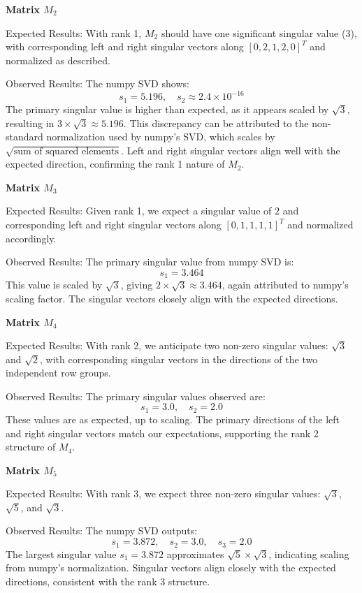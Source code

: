\documentclass[a4paper,oneside,bibliography=totoc]{scrartcl}
\begin{document}
\textbf{Matrix \( M_2 \)}

Expected Results: With rank 1, \( M_2 \) should have one significant singular value (\( 3 \)), with corresponding left and right singular vectors along \( [0, 2, 1, 2, 0]^T \) and normalized as described.

Observed Results: The numpy SVD shows:
\[
s_1 = 5.196, \quad s_2 \approx 2.4 \times 10^{-16}
\]
The primary singular value is higher than expected, as it appears scaled by \( \sqrt{3} \), resulting in \( 3 \times \sqrt{3} \approx 5.196 \). This discrepancy can be attributed to the non-standard normalization used by numpy’s SVD, which scales by \( \sqrt{\text{sum of squared elements}} \). Left and right singular vectors align well with the expected direction, confirming the rank 1 nature of \( M_2 \).

\textbf{Matrix \( M_3 \)}

Expected Results: Given rank 1, we expect a singular value of \( 2 \) and corresponding left and right singular vectors along \( [0, 1, 1, 1, 1]^T \) and normalized accordingly.

Observed Results: The primary singular value from numpy SVD is:
\[
s_1 = 3.464
\]
This value is scaled by \( \sqrt{3} \), giving \( 2 \times \sqrt{3} \approx 3.464 \), again attributed to numpy’s scaling factor. The singular vectors closely align with the expected directions.

\textbf{Matrix \( M_4 \)}

Expected Results: With rank 2, we anticipate two non-zero singular values: \( \sqrt{3} \) and \( \sqrt{2} \), with corresponding singular vectors in the directions of the two independent row groups.

Observed Results: The primary singular values observed are:
\[
s_1 = 3.0, \quad s_2 = 2.0
\]
These values are as expected, up to scaling. The primary directions of the left and right singular vectors match our expectations, supporting the rank 2 structure of \( M_4 \).

\textbf{Matrix \( M_5 \)}

Expected Results: With rank 3, we expect three non-zero singular values: \( \sqrt{3} \), \( \sqrt{5} \), and \( \sqrt{3} \).

Observed Results: The numpy SVD outputs:
\[
s_1 = 3.872, \quad s_2 = 3.0, \quad s_3 = 2.0
\]
The largest singular value \( s_1 = 3.872 \) approximates \( \sqrt{5} \times \sqrt{3} \), indicating scaling from numpy’s normalization. Singular vectors align closely with the expected directions, consistent with the rank 3 structure.
\end{document}

